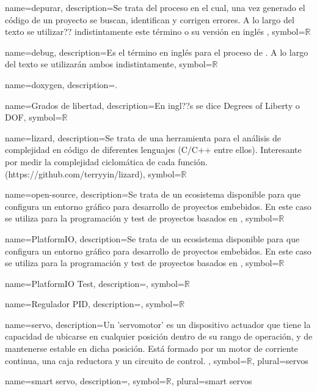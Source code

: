 {
  name={depurar},
  description={Se trata del proceso en el cual, una vez generado el código de un proyecto se buscan, identifican y corrigen errores. A lo largo del texto se utilizar?? indistintamente este término o su versión en inglés },
  symbol={\ensuremath{\mathbb{R}}}
}

{
  name={debug},
  description={Es el término en inglés para el proceso de . A lo largo del texto se utilizarán ambos indistintamente},
  symbol={\ensuremath{\mathbb{R}}}
}

{
  name={doxygen},
  description={\completar.}
}


{
  name={Grados de libertad},
  description={\completar En ingl??s se dice Degrees of Liberty o DOF},
  symbol={\ensuremath{\mathbb{R}}}
}


{
  name={lizard},
  description={Se trata de una herramienta para el análisis de complejidad en código de diferentes lenguajes (C/C++ entre ellos). Interesante por medir la complejidad ciclomática de cada función. (https://github.com/terryyin/lizard)},
  symbol={\ensuremath{\mathbb{R}}}
}

{
  name={open-source},
  description={Se trata de un ecosistema  disponible para  que configura un entorno gráfico para desarrollo de proyectos embebidos. En este caso se utiliza para la programación y test de proyectos basados en },
  symbol={\ensuremath{\mathbb{R}}}
}

{
  name={PlatformIO},
  description={Se trata de un ecosistema  disponible para  que configura un entorno gráfico para desarrollo de proyectos embebidos. En este caso se utiliza para la programación y test de proyectos basados en },
  symbol={\ensuremath{\mathbb{R}}}
}

{
  name={PlatformIO Test},
  description={\completar},
  symbol={\ensuremath{\mathbb{R}}}
}

{
  name={Regulador PID},
  description={\completar},
  symbol={\ensuremath{\mathbb{R}}}
}

{
  name={servo},
  description={Un 'servomotor' es un dispositivo actuador que tiene la capacidad de ubicarse en cualquier posición dentro de su rango de operación, y de mantenerse estable en dicha posición. Está formado por un motor de corriente continua, una caja reductora y un circuito de control. %
  \completar },
  symbol={\ensuremath{\mathbb{R}}},
  plural={servos}
}

{
  name={smart servo},
  description={\completar},
  symbol={\ensuremath{\mathbb{R}}},
  plural={smart servos}
}





